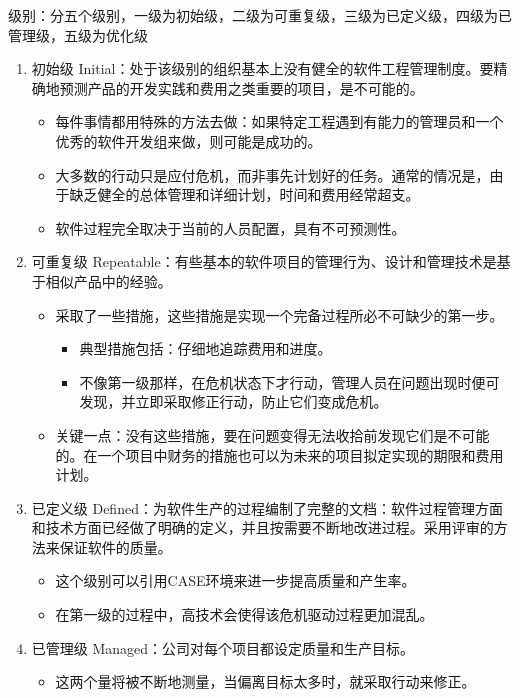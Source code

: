 级别：分五个级别，一级为初始级，二级为可重复级，三级为已定义级，四级为已管理级，五级为优化级
\begin{enumerate}[label=\arabic*.]
    \item 初始级 Initial：处于该级别的组织基本上没有健全的软件工程管理制度。要精确地预测产品的开发实践和费用之类重要的项目，是不可能的。
    \begin{itemize}
        \item 每件事情都用特殊的方法去做：如果特定工程遇到有能力的管理员和一个优秀的软件开发组来做，则可能是成功的。
        \item 大多数的行动只是应付危机，而非事先计划好的任务。通常的情况是，由于缺乏健全的总体管理和详细计划，时间和费用经常超支。
        \item 软件过程完全取决于当前的人员配置，具有不可预测性。
    \end{itemize}
    \item 可重复级 Repeatable：有些基本的软件项目的管理行为、设计和管理技术是基于相似产品中的经验。
    \begin{itemize}
        \item 采取了一些措施，这些措施是实现一个完备过程所必不可缺少的第一步。
        \begin{itemize}
            \item 典型措施包括：仔细地追踪费用和进度。
            \item 不像第一级那样，在危机状态下才行动，管理人员在问题出现时便可发现，并立即采取修正行动，防止它们变成危机。
        \end{itemize}
        \item 关键一点：没有这些措施，要在问题变得无法收拾前发现它们是不可能的。在一个项目中财务的措施也可以为未来的项目拟定实现的期限和费用计划。
    \end{itemize}
    \item 已定义级 Defined：为软件生产的过程编制了完整的文档：软件过程管理方面和技术方面已经做了明确的定义，并且按需要不断地改进过程。采用评审的方法来保证软件的质量。
    \begin{itemize}
        \item 这个级别可以引用CASE环境来进一步提高质量和产生率。
        \item 在第一级的过程中，高技术会使得该危机驱动过程更加混乱。
    \end{itemize}
    \item 已管理级 Managed：公司对每个项目都设定质量和生产目标。
    \begin{itemize}
        \item 这两个量将被不断地测量，当偏离目标太多时，就采取行动来修正。

\end{itemize}
\end{enumerate}
